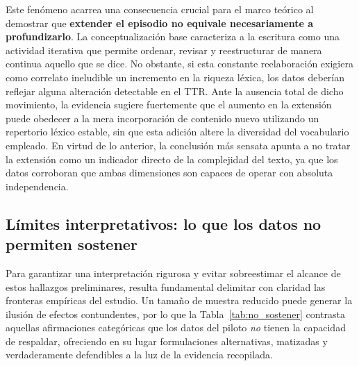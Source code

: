 \documentclass[12pt]{article}
\begin{document}
	Este fenómeno acarrea una consecuencia crucial para el marco teórico al demostrar que \textbf{extender el episodio no equivale necesariamente a profundizarlo}. La conceptualización base caracteriza a la escritura como una actividad iterativa que permite ordenar, revisar y reestructurar de manera continua aquello que se dice. No obstante, si esta constante reelaboración exigiera como correlato ineludible un incremento en la riqueza léxica, los datos deberían reflejar alguna alteración detectable en el TTR. Ante la ausencia total de dicho movimiento, la evidencia sugiere fuertemente que el aumento en la extensión puede obedecer a la mera incorporación de contenido nuevo utilizando un repertorio léxico estable, sin que esta adición altere la diversidad del vocabulario empleado. En virtud de lo anterior, la conclusión más sensata apunta a no tratar la extensión como un indicador directo de la complejidad del texto, ya que los datos corroboran que ambas dimensiones son capaces de operar con absoluta independencia.
	
	\subsection{Límites interpretativos: lo que los datos no permiten sostener}
	
	Para garantizar una interpretación rigurosa y evitar sobreestimar el alcance de estos hallazgos preliminares, resulta fundamental delimitar con claridad las fronteras empíricas del estudio. Un tamaño de muestra reducido puede generar la ilusión de efectos contundentes, por lo que la Tabla~\ref{tab:no_sostener} contrasta aquellas afirmaciones categóricas que los datos del piloto \emph{no} tienen la capacidad de respaldar, ofreciendo en su lugar formulaciones alternativas, matizadas y verdaderamente defendibles a la luz de la evidencia recopilada.
	
\end{document}
